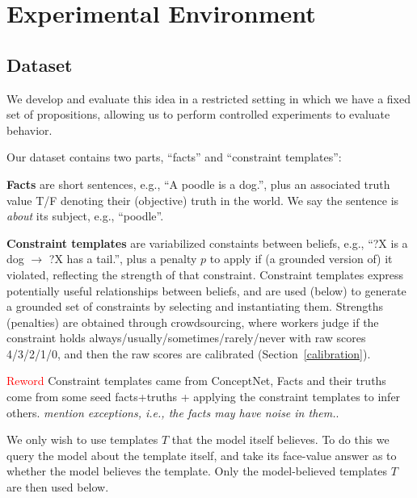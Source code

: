 \documentclass[11pt]{article}
\newcommand{\red}[1]{\textcolor{red}{#1}}
\newenvironment{des}{                 %
     \parskip 0cm \begin{list}{}{\parsep 0cm \itemsep 0cm \topsep 0cm}}{
       \end{list}} %
\begin{document}
\section{Experimental Environment}

\subsection{Dataset}

We develop and evaluate this idea in a restricted setting in which we have a
fixed set of propositions, allowing us to perform controlled experiments to evaluate behavior.

Our dataset contains two parts, ``facts'' and ``constraint templates'':
\begin{des}
\item[{\bf Facts}] are short sentences, e.g., ``A poodle is a dog.'', plus an associated truth value T/F
denoting their (objective) truth in the world.
We say the sentence is {\it about} its subject, e.g., ``poodle''.
\item[{\bf Constraint templates}] are variabilized constaints between beliefs, e.g., ``?X is a dog $\rightarrow$ ?X has a tail.'', plus a penalty $p$ to apply if (a grounded version of) it violated, reflecting the strength of that constraint.
Constraint templates express potentially useful relationships between beliefs, and
are used (below) to generate a grounded set of constraints by selecting and instantiating them. Strengths (penalties) are obtained through crowdsourcing, where workers judge if
the constraint holds always/usually/sometimes/rarely/never with raw scores 4/3/2/1/0, and then the raw scores are calibrated (Section~\ref{calibration}).
\end{des}

\red{Reword} Constraint templates came from ConceptNet, Facts and their truths come from some seed facts+truths + applying the constraint templates to infer others.
{\it mention exceptions, i.e., the facts may have noise in them.}.

We only wish to use templates $T$ that the model itself believes. To do this we query the model about
the template itself, and take its face-value answer as to whether the model believes the template.
Only the model-believed templates $T$ are then used below.
\end{document}
